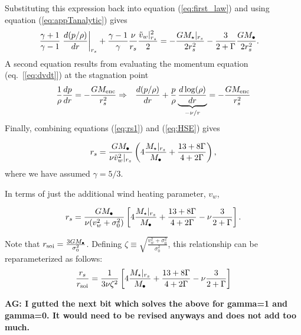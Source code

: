 Substituting this expression back into equation (\ref{eq:first_law}) and using equation (\ref{eq:appTanalytic}) gives
\begin{align}
&\frac{\gamma+1}{\gamma-1}
\left.\frac{d (p/\rho)}{d r}\right|_{r_s}+ \frac{\gamma-1}{\gamma} \frac{\nu}{r_s} \frac{\tilde{v}_{w}|_{r_s}^{2}}{2} = -\frac{G
  M_{\star}|_{r_s}}{2 r_s^2} -\frac{3}{2+\Gamma} \frac{G M_{\bullet}}{2 r_s^2}.  \label{eq:rs1}
\end{align}
A second equation results from evaluating the momentum equation (eq.~[\ref{eq:dvdt}]) at the stagnation point
\begin{align}
&\frac{1}{\rho}\frac{d p}{d r}=- \frac{GM_{\rm enc}}{r_s^2} \Rightarrow
&\frac{d (p/\rho)}{d r}+\frac{p}{\rho}
\underbrace{\frac{d\log(\rho)}{dr}}_{-\nu/r} = -\frac{G M_{\rm enc}}{r_s^2} \label{eq:HSE}
\end{align}
Finally, combining equations (\ref{eq:rs1}) and (\ref{eq:HSE}) gives 

\begin{align}
r_s=\frac{G M_{\bullet}}{\nu \tilde{v}_{w}^{2}|_{r_s}}\left(4
  \frac{M_{\star}|_{r_s}}{M_{\bullet}} +\frac{13+ 8\Gamma}{4+2\Gamma}\right),
\end{align}
where we have assumed $\gamma=5/3$.

In terms of just the additional wind heating parameter, $v_w$,

\begin{align}
  r_s=\frac{G M_{\bullet}}{\nu (v_w^{2}+\sigma_0^2)}\left[4
    \frac{M_{\star}|_{r_s}}{M_{\bullet}} +\frac{13+ 8\Gamma}{4+2\Gamma}-\nu \frac{3}{2+\Gamma}\right].
\label{eq:rs2main}
\end{align}

Note that $r_{\rm soi}=\frac{3 G M_{\bullet}}{\sigma_0^2}$. Defining $\zeta \equiv
\sqrt{\frac{v_w^2+\sigma_0^2}{\sigma_0^2}}$, this relationship can be reparameterized as
follows:
\begin{align}
  \frac{r_s}{r_{\rm soi}}=\frac{1}{3\nu \zeta^2} \left[4\frac{M_{\star}|_{r_s}}{M_{\bullet}} +\frac{13+8\Gamma}{4+2\Gamma}-\nu \frac{3}{2+\Gamma}\right]
  \label{eq:rsRinf}
\end{align}

{\bf AG: I gutted the next bit which solves the above for gamma=1 and
  gamma=0. It would need to be revised anyways and does not add too much.}

